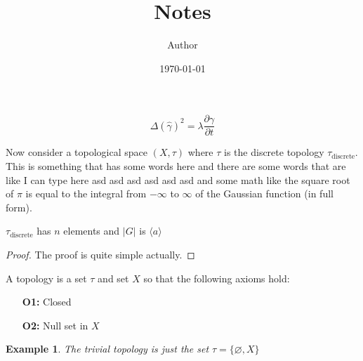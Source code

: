 \documentclass[12pt]{article}
\title{Notes}
\author{Author}
\date{\today}
\newtheorem{example}{Example}
\begin{document}
\maketitle

\[
\Delta (\hat{\gamma})^2 = \lambda \frac{\partial \gamma}{\partial t}
\]

Now consider a topological space \((X, \tau)\) where \(\tau\) is the discrete topology \(\tau_{\text{discrete}}\). This is something that has some words here and there are some words that are like I can type here asd asd asd asd asd asd and some math like the square root of \(\pi\) is equal to the integral from \(-\infty\) to \(\infty\) of the Gaussian function (in full form).

\begin{theorem}
\(\tau_{\text{discrete}}\) has \(n\) elements and \(|G|\) is \(\langle a \rangle\)
\end{theorem}

\begin{proof}
The proof is quite simple actually.
\end{proof}

\begin{definition}
A topology is a set \(\tau\) and set \(X\) so that the following axioms hold:
\begin{enumerate}
\item[\textbf{O1:}] Closed
\item[\textbf{O2:}] Null set in \(X\)
\end{enumerate}
\end{definition}

\begin{example}
The trivial topology is just the set \(\tau = \{\varnothing, X\}\)
\end{example}
\end{document}
